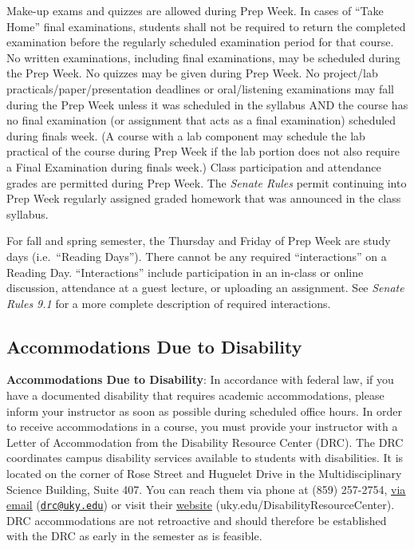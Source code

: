 \documentclass[
  letterpaper,
  DIV=11,
  numbers=noendperiod]{scrartcl}
\begin{document}
Make-up exams and quizzes are allowed during Prep Week. In cases of
``Take Home'' final examinations, students shall not be required to
return the completed examination before the regularly scheduled
examination period for that course. No written examinations, including
final examinations, may be scheduled during the Prep Week. No quizzes
may be given during Prep Week. No project/lab
practicals/paper/presentation deadlines or oral/listening examinations
may fall during the Prep Week unless it was scheduled in the syllabus
AND the course has no final examination (or assignment that acts as a
final examination) scheduled during finals week. (A course with a lab
component may schedule the lab practical of the course during Prep Week
if the lab portion does not also require a Final Examination during
finals week.) Class participation and attendance grades are permitted
during Prep Week. The \emph{Senate Rules} permit continuing into Prep
Week regularly assigned graded homework that was announced in the class
syllabus.

For fall and spring semester, the Thursday and Friday of Prep Week are
study days (i.e.~``Reading Days''). There cannot be any required
``interactions'' on a Reading Day. ``Interactions'' include
participation in an in-class or online discussion, attendance at a guest
lecture, or uploading an assignment. See \emph{Senate Rules 9.1} for a
more complete description of required interactions.

\hypertarget{accommodations-due-to-disability}{%
\subsection{Accommodations Due to
Disability}\label{accommodations-due-to-disability}}

\textbf{Accommodations Due to Disability}: In accordance with federal
law, if you have a documented disability that requires academic
accommodations, please inform your instructor as soon as possible during
scheduled office hours. In order to receive accommodations in a course,
you must provide your instructor with a Letter of Accommodation from the
Disability Resource Center (DRC). The DRC coordinates campus disability
services available to students with disabilities. It is located on the
corner of Rose Street and Huguelet Drive in the Multidisciplinary
Science Building, Suite 407. You can reach them via phone at (859)
257-2754,
\href{https://www.uky.edu/universitysenate/drc@uky.edu}{\uline{via
email}} (\href{mailto:drc@uky.edu}{\nolinkurl{drc@uky.edu}}) or visit
their
\href{http://www.uky.edu/DisabilityResourceCenter}{\uline{website}}
(uky.edu/DisabilityResourceCenter). DRC accommodations are not
retroactive and should therefore be established with the DRC as early in
the semester as is feasible.
\end{document}
